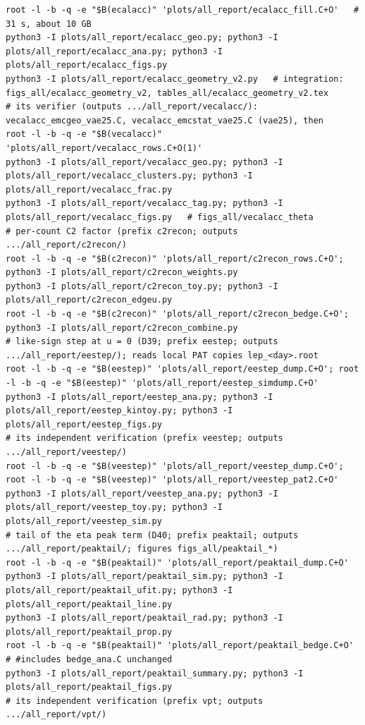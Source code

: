 \documentclass[11pt,a4paper]{article}
\begin{document}
\begin{lstlisting}
root -l -b -q -e "$B(ecalacc)" 'plots/all_report/ecalacc_fill.C+O'   # 31 s, about 10 GB
python3 -I plots/all_report/ecalacc_geo.py; python3 -I plots/all_report/ecalacc_ana.py; python3 -I plots/all_report/ecalacc_figs.py
python3 -I plots/all_report/ecalacc_geometry_v2.py   # integration: figs_all/ecalacc_geometry_v2, tables_all/ecalacc_geometry_v2.tex
# its verifier (outputs .../all_report/vecalacc/): vecalacc_emcgeo_vae25.C, vecalacc_emcstat_vae25.C (vae25), then
root -l -b -q -e "$B(vecalacc)" 'plots/all_report/vecalacc_rows.C+O(1)'
python3 -I plots/all_report/vecalacc_geo.py; python3 -I plots/all_report/vecalacc_clusters.py; python3 -I plots/all_report/vecalacc_frac.py
python3 -I plots/all_report/vecalacc_tag.py; python3 -I plots/all_report/vecalacc_figs.py   # figs_all/vecalacc_theta
# per-count C2 factor (prefix c2recon; outputs .../all_report/c2recon/)
root -l -b -q -e "$B(c2recon)" 'plots/all_report/c2recon_rows.C+O'; python3 -I plots/all_report/c2recon_weights.py
python3 -I plots/all_report/c2recon_toy.py; python3 -I plots/all_report/c2recon_edgeu.py
root -l -b -q -e "$B(c2recon)" 'plots/all_report/c2recon_bedge.C+O'; python3 -I plots/all_report/c2recon_combine.py
# like-sign step at u = 0 (D39; prefix eestep; outputs .../all_report/eestep/); reads local PAT copies lep_<day>.root
root -l -b -q -e "$B(eestep)" 'plots/all_report/eestep_dump.C+O'; root -l -b -q -e "$B(eestep)" 'plots/all_report/eestep_simdump.C+O'
python3 -I plots/all_report/eestep_ana.py; python3 -I plots/all_report/eestep_kintoy.py; python3 -I plots/all_report/eestep_figs.py
# its independent verification (prefix veestep; outputs .../all_report/veestep/)
root -l -b -q -e "$B(veestep)" 'plots/all_report/veestep_dump.C+O'; root -l -b -q -e "$B(veestep)" 'plots/all_report/veestep_pat2.C+O'
python3 -I plots/all_report/veestep_ana.py; python3 -I plots/all_report/veestep_toy.py; python3 -I plots/all_report/veestep_sim.py
# tail of the eta peak term (D40; prefix peaktail; outputs .../all_report/peaktail/; figures figs_all/peaktail_*)
root -l -b -q -e "$B(peaktail)" 'plots/all_report/peaktail_dump.C+O'
python3 -I plots/all_report/peaktail_sim.py; python3 -I plots/all_report/peaktail_ufit.py; python3 -I plots/all_report/peaktail_line.py
python3 -I plots/all_report/peaktail_rad.py; python3 -I plots/all_report/peaktail_prop.py
root -l -b -q -e "$B(peaktail)" 'plots/all_report/peaktail_bedge.C+O'   # #includes bedge_ana.C unchanged
python3 -I plots/all_report/peaktail_summary.py; python3 -I plots/all_report/peaktail_figs.py
# its independent verification (prefix vpt; outputs .../all_report/vpt/)

\end{lstlisting}
\end{document}
